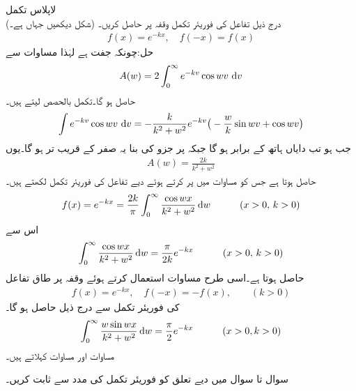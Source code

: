 \quad لاپلاس تکمل\\
درج ذیل تفاعل کی فوریئر تکمل وقفہ  پر حاصل کریں۔ (شکل  دیکھیں جہاں  ہے۔)
\begin{align*}
f(x)=e^{-kx}, \quad f(-x)=f(x)
\end{align*}
حل:چونکہ  جفت ہے لہٰذا مساوات  سے 
\begin{align*}
A(w)=2\int_0^{\infty} e^{-kv}\cos wv\,\dif v
\end{align*}
حاصل ہو گا۔تکمل بالحصص لیتے ہیں۔
\begin{align*}
\int e^{-kv}\cos wv\,\dif v=-\frac{k}{k^2+w^2}e^{-kv}\big(-\frac{w}{k}\sin wv+\cos wv\big)
\end{align*}
جب  ہو تب دایاں ہاتھ  کے برابر ہو گا جبکہ  پر  جزو کی بنا یہ صفر کے قریب تر ہو گا۔یوں
\begin{align*}
A(w)=\frac{2k}{k^2+w^2}
\end{align*}
حاصل ہوتا ہے جس کو مساوات  میں پر کرتے ہوئے دیے تفاعل کی فوریئر تکمل لکھتے ہیں۔
\begin{align*}
f(x)=e^{-kx}=\frac{2k}{\pi}\int_0^{\infty} \frac{\cos wx}{k^2+w^2}\dif w\quad \quad \quad (x>0,\, k>0)
\end{align*}
اس سے 
\begin{align}\label{مساوات_فوریئر_لاپلاس_تکمل_الف}
\int_0^{\infty} \frac{\cos wx}{k^2+w^2}\dif w=\frac{\pi}{2k}e^{-kx}\quad \quad \quad (x>0,\, k>0)
\end{align}
حاصل ہوتا ہے۔اسی طرح مساوات   استعمال کرتے ہوئے وقفہ  پر  طاق تفاعل
\begin{align*}
f(x)=e^{-kx},\quad f(-x)=-f(x), \quad \quad (k>0)
\end{align*}
 کی فوریئر تکمل سے  درج ذیل حاصل ہو گا۔
\begin{align}\label{مساوات_فوریئر_لاپلاس_تکمل_ب}
\int_0^{\infty} \frac{w\sin wx}{k^2+w^2}\dif w=\frac{\pi}{2}e^{-kx}\quad \quad \quad (x>0, k>0)
\end{align}
مساوات  اور مساوات   کہلاتے ہیں۔

سوال  تا سوال  میں دیے تعلق کو فوریئر تکمل کی مدد سے ثابت کریں۔

